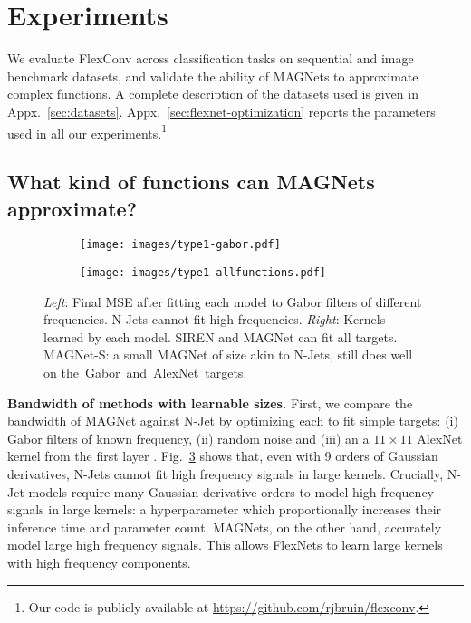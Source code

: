 \documentclass{article} \usepackage{iclr2022_conference,times}
\begin{document}
\section{Experiments}\label{sec:experiments}
\vspace{-2mm}
We evaluate FlexConv across classification tasks on sequential and image benchmark datasets, and validate the ability of MAGNets to approximate complex functions. A complete description of the datasets used is given in Appx.~\ref{sec:datasets}. Appx.~\ref{sec:flexnet-optimization} reports the parameters used in all our experiments.\footnote{Our code is publicly available at \url{https://github.com/rjbruin/flexconv}.}
\vspace{-2mm}
\subsection{What kind of functions can MAGNets approximate?}
\label{sec:type1-experiment}
\vspace{-2mm}
\begin{figure}
    \centering
     \begin{subfigure}[c]{0.49\textwidth}
         \centering
         \texttt{[image: images/type1-gabor.pdf]}
\label{fig:exp-type1-gabor-graph}
     \end{subfigure}
     \hfill
     \begin{subfigure}[c]{0.49\textwidth}
         \centering
         \vspace{-8mm}
\texttt{[image: images/type1-allfunctions.pdf]}
\label{fig:exp-type1-gabor-kernels}
     \end{subfigure}
     \hfill
    \vspace{-9mm}
    \caption{\textit{Left}: Final MSE after fitting each model to Gabor filters of different frequencies. N-Jets cannot fit high frequencies. \textit{Right}: Kernels learned by each model. SIREN and MAGNet can fit all targets. MAGNet-S: a small MAGNet of size akin to N-Jets, still does well on the~Gabor~and~AlexNet~targets.
    \vspace{-7mm}}
    \label{fig:exp-type1-gabor}
\end{figure}
\textbf{Bandwidth of methods with learnable sizes.} First, we compare the bandwidth of MAGNet against N-Jet \citep{pintea2021resolution} by optimizing each to fit simple targets: (i) Gabor filters of known frequency, (ii) random noise and (iii) an a $11\times11$ AlexNet kernel from the first layer \citep{krizhevsky_imagenet_2012}.\break
Fig.~\ref{fig:exp-type1-gabor} shows that, even with 9 orders of Gaussian derivatives, N-Jets cannot fit high frequency signals in large kernels. Crucially, N-Jet models require many Gaussian derivative orders to model high frequency signals in large kernels: a hyperparameter which proportionally increases their inference time and parameter count. MAGNets, on the other hand, accurately model large high frequency signals. This allows FlexNets to learn large kernels with high frequency components.
\end{document}
